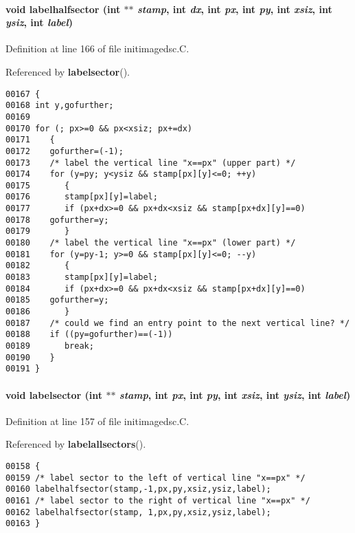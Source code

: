 \paragraph{\setlength{\rightskip}{0pt plus 5cm}void labelhalfsector (int $\ast$$\ast$ {\em stamp}, int {\em dx}, int {\em px}, int {\em py}, int {\em xsiz}, int {\em ysiz}, int {\em label})}\hfill



Definition at line 166 of file initimagedsc.C.

Referenced by {\bf labelsector}().\small\begin{verbatim}00167 {
00168 int y,gofurther;
00169 
00170 for (; px>=0 && px<xsiz; px+=dx)
00171    {
00172    gofurther=(-1);
00173    /* label the vertical line "x==px" (upper part) */
00174    for (y=py; y<ysiz && stamp[px][y]<=0; ++y)
00175       {
00176       stamp[px][y]=label;
00177       if (px+dx>=0 && px+dx<xsiz && stamp[px+dx][y]==0)
00178    gofurther=y;
00179       }
00180    /* label the vertical line "x==px" (lower part) */
00181    for (y=py-1; y>=0 && stamp[px][y]<=0; --y)
00182       {
00183       stamp[px][y]=label;
00184       if (px+dx>=0 && px+dx<xsiz && stamp[px+dx][y]==0)
00185    gofurther=y;
00186       }
00187    /* could we find an entry point to the next vertical line? */
00188    if ((py=gofurther)==(-1))
00189       break;
00190    }
00191 }
\end{verbatim}\normalsize 
\label{initimagedsc.C_a4}
\paragraph{\setlength{\rightskip}{0pt plus 5cm}void labelsector (int $\ast$$\ast$ {\em stamp}, int {\em px}, int {\em py}, int {\em xsiz}, int {\em ysiz}, int {\em label})}\hfill



Definition at line 157 of file initimagedsc.C.

Referenced by {\bf labelallsectors}().\small\begin{verbatim}00158 {
00159 /* label sector to the left of vertical line "x==px" */
00160 labelhalfsector(stamp,-1,px,py,xsiz,ysiz,label);
00161 /* label sector to the right of vertical line "x==px" */
00162 labelhalfsector(stamp, 1,px,py,xsiz,ysiz,label);
00163 }
\end{verbatim}\normalsize 
\label{initimagedsc.C_a6}
